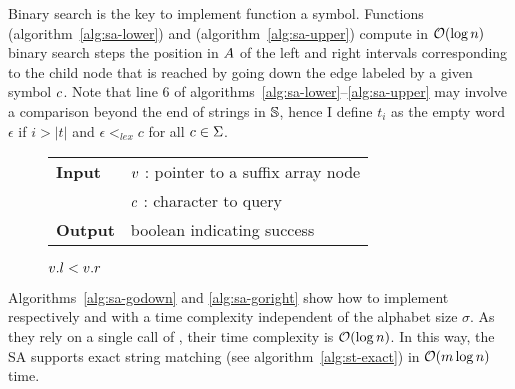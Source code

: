 Binary search is the key to implement function  a symbol.
Functions  (algorithm~\ref{alg:sa-lower}) and  (algorithm~\ref{alg:sa-upper}) compute in $\mathcal{O}(\log{n})$ binary search steps the position in $A$ of the left and right intervals corresponding to the child node that is reached by going down the edge labeled by a given symbol $c$.
Note that line 6 of algorithms~\ref{alg:sa-lower}--\ref{alg:sa-upper} may involve a comparison beyond the end of strings in $\mathbb{S}$, hence I define $t_i$ as the empty word $\epsilon$ if $i > |t|$ and $\epsilon <_{lex} c$ for all $c \in \Sigma$.

\begin{figure*}[b!]
\begin{center}
\begin{minipage}[t]{.6\textwidth}
\begin{algorithm}[H]
\begin{tabular}{ll}
\textbf{Input}  & $v$ : pointer to a suffix array node\\
				& $c$ : character to query\\
\textbf{Output} & boolean indicating success\\
\end{tabular}
\begin{algorithmic}[1]
	\State \Return \False
\EndIf
{}
\State \Return $v.l < v.r$
\end{algorithmic}
\label{alg:sa-godownc}
\end{algorithm}
\end{minipage}
\end{center}
\end{figure*}

Algorithms~\ref{alg:sa-godown} and \ref{alg:sa-goright} show how to implement respectively  and  with a time complexity independent of the alphabet size $\sigma$.
As they rely on a single call of , their time complexity is $\mathcal{O}(\log{n})$.
In this way, the SA supports exact string matching (see algorithm~\ref{alg:st-exact}) in $\mathcal{O}(m \log{n})$ time.

